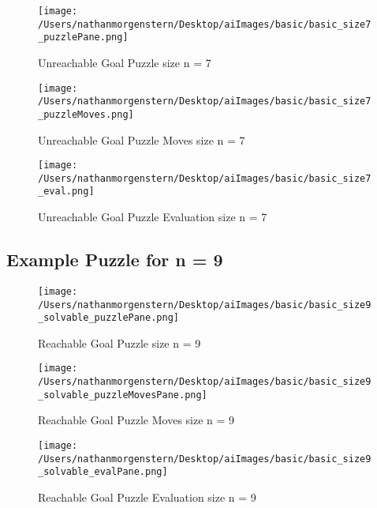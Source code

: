 \documentclass{report}
\begin{document}
	\begin{figure}[H]
	\centering
	\texttt{[image: /Users/nathanmorgenstern/Desktop/aiImages/basic/basic\_size7\_puzzlePane.png]}
	\caption{Unreachable Goal Puzzle size n = 7}
	\label{fig: Basic Evaluation n = 7 unreachable goal puzzle }
	\end{figure}
	
	\begin{figure}[H]
	\centering
	\texttt{[image: /Users/nathanmorgenstern/Desktop/aiImages/basic/basic\_size7\_puzzleMoves.png]}
	\caption{Unreachable Goal Puzzle Moves size n = 7}
	\label{fig: Basic Evaluation n = 7 unreachable goal puzzle moves}
	\end{figure}
	
	\begin{figure}[H]
	\centering
	\texttt{[image: /Users/nathanmorgenstern/Desktop/aiImages/basic/basic\_size7\_eval.png]}
	\caption{Unreachable Goal Puzzle Evaluation size n = 7}
	\label{fig: Basic Evaluation n = 7 unreachable goal puzzle evaluation}
	\end{figure}


\subsection{Example Puzzle for n = 9}

	\begin{figure}[H]
	\centering
	\texttt{[image: /Users/nathanmorgenstern/Desktop/aiImages/basic/basic\_size9\_solvable\_puzzlePane.png]}
	\caption{Reachable Goal Puzzle size n = 9}
	\label{fig: Basic Evaluation n = 9 reachable goal puzzle }
	\end{figure}
	
	\begin{figure}[H]
	\centering
	\texttt{[image: /Users/nathanmorgenstern/Desktop/aiImages/basic/basic\_size9\_solvable\_puzzleMovesPane.png]}
	\caption{Reachable Goal Puzzle Moves size n = 9}
	\label{fig: Basic Evaluation n = 9 reachable goal puzzle moves}
	\end{figure}
	
	\begin{figure}[H]
	\centering
	\texttt{[image: /Users/nathanmorgenstern/Desktop/aiImages/basic/basic\_size9\_solvable\_evalPane.png]}
	\caption{Reachable Goal Puzzle Evaluation size n = 9}
	\label{fig: Basic Evaluation n = 9 reachable goal puzzle evaluation}
	\end{figure}
	
\end{document}
